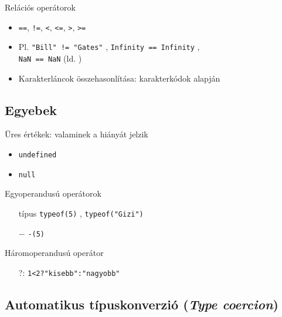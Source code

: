 \begin{frame}
    Relációs operátorok
    \begin{itemize}
        \item \texttt{==}, \texttt{!=}, \texttt{<}, \texttt{<=}, \texttt{>}, \texttt{>=} 
        \item Pl. \texttt{"Bill" != "Gates"} , \texttt{Infinity == Infinity} , \\  \texttt{NaN == NaN}  (ld. )
        \item Karakterláncok összehasonlítása: karakterkódok alapján
    \end{itemize}
\end{frame}

\subsection{Egyebek}

\begin{frame}
    Üres értékek: valaminek a hiányát jelzik
    \begin{itemize}
        \item \texttt{undefined}
        \item \texttt{null}
    \end{itemize}
    \vfill
    Egyoperandusú operátorok
    \begin{itemize}
        \item[típus] \texttt{typeof(5)} , \texttt{typeof("Gizi")} 
        \item[$-$] \texttt{-(5)} 
    \end{itemize}
    \vfill
    Háromoperandusú operátor
    \begin{itemize}
        \item[?:] \texttt{1<2?"kisebb":"nagyobb"} 
    \end{itemize}
\end{frame}

\subsection{Automatikus típuskonverzió (\emph{Type coercion})}

